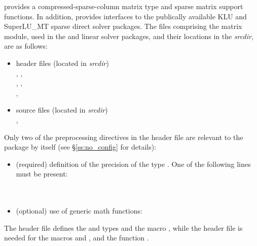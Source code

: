 {\sundials} provides a compressed-sparse-column matrix type and sparse
matrix support functions.  In addition, {\sundials} provides interfaces
to the publically available KLU and SuperLU\_MT sparse direct solver packages.
The files comprising the {\sls} matrix module, used in the {\klu} and
{\superlumt} linear solver packages, and their locations
in the {\sundials} {\em srcdir}, are as follows:
\begin{itemize}
\item header files (located in {\em srcdir})\\
  , , \\
  , , \\
  ,  
\item source files (located in {\em srcdir})\\
  , 
\end{itemize}
Only two of the preprocessing directives in the header file  
are relevant to the {\sls} package by itself (see \S\ref{ss:no_config} for details):
\begin{itemize}
\item (required) definition of the precision of the {\sundials} type . 
  One of the following lines must be present:\\
  \\
  \\
\item (optional) use of generic math functions:
\end{itemize}
The  header file defines the {\sundials}  and
 types and the macro , while the 
header file is needed for the macros  and , and the
function .

